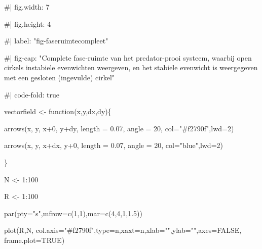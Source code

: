 \documentclass[
  a4paper,
]{scrbook}
\newenvironment{Shaded}{\begin{snugshade}}{\end{snugshade}}
\newcommand{\AttributeTok}[1]{\textcolor[rgb]{0.40,0.45,0.13}{#1}}
\newcommand{\CommentTok}[1]{\textcolor[rgb]{0.37,0.37,0.37}{#1}}
\newcommand{\ConstantTok}[1]{\textcolor[rgb]{0.56,0.35,0.01}{#1}}
\newcommand{\ControlFlowTok}[1]{\textcolor[rgb]{0.00,0.23,0.31}{#1}}
\newcommand{\DecValTok}[1]{\textcolor[rgb]{0.68,0.00,0.00}{#1}}
\newcommand{\FloatTok}[1]{\textcolor[rgb]{0.68,0.00,0.00}{#1}}
\newcommand{\FunctionTok}[1]{\textcolor[rgb]{0.28,0.35,0.67}{#1}}
\newcommand{\NormalTok}[1]{\textcolor[rgb]{0.00,0.23,0.31}{#1}}
\newcommand{\OtherTok}[1]{\textcolor[rgb]{0.00,0.23,0.31}{#1}}
\newcommand{\SpecialCharTok}[1]{\textcolor[rgb]{0.37,0.37,0.37}{#1}}
\newcommand{\StringTok}[1]{\textcolor[rgb]{0.13,0.47,0.30}{#1}}
\theoremstyle{definition}
\theoremstyle{remark}
\begin{document}
\begin{Shaded}
\begin{Highlighting}[]
\CommentTok{\#| fig.width: 7}

\CommentTok{\#| fig.height: 4}

\CommentTok{\#| label: "fig{-}faseruimtecompleet"}

\CommentTok{\#| fig{-}cap: "Complete fase{-}ruimte van het predator{-}prooi systeem, waarbij open cirkels instabiele evenwichten weergeven, en het stabiele evenwicht is weergegeven met een gesloten (ingevulde) cirkel"}

\CommentTok{\#| code{-}fold: true}

\NormalTok{vectorfield }\OtherTok{\textless{}{-}} \ControlFlowTok{function}\NormalTok{(x,y,dx,dy)\{}

  \FunctionTok{arrows}\NormalTok{(x, y, x}\SpecialCharTok{+}\DecValTok{0}\NormalTok{, y}\SpecialCharTok{+}\NormalTok{dy, }\AttributeTok{length =} \FloatTok{0.07}\NormalTok{, }\AttributeTok{angle =} \DecValTok{20}\NormalTok{, }\AttributeTok{col=}\StringTok{"\#f2790f"}\NormalTok{,}\AttributeTok{lwd=}\DecValTok{2}\NormalTok{)}

  \FunctionTok{arrows}\NormalTok{(x, y, x}\SpecialCharTok{+}\NormalTok{dx, y}\SpecialCharTok{+}\DecValTok{0}\NormalTok{, }\AttributeTok{length =} \FloatTok{0.07}\NormalTok{, }\AttributeTok{angle =} \DecValTok{20}\NormalTok{, }\AttributeTok{col=}\StringTok{"blue"}\NormalTok{,}\AttributeTok{lwd=}\DecValTok{2}\NormalTok{)}

\NormalTok{\}}

\NormalTok{N }\OtherTok{\textless{}{-}} \DecValTok{1}\SpecialCharTok{:}\DecValTok{100}

\NormalTok{R }\OtherTok{\textless{}{-}} \DecValTok{1}\SpecialCharTok{:}\DecValTok{100}

\FunctionTok{par}\NormalTok{(}\AttributeTok{pty=}\StringTok{"s"}\NormalTok{,}\AttributeTok{mfrow=}\FunctionTok{c}\NormalTok{(}\DecValTok{1}\NormalTok{,}\DecValTok{1}\NormalTok{),}\AttributeTok{mar=}\FunctionTok{c}\NormalTok{(}\DecValTok{4}\NormalTok{,}\DecValTok{4}\NormalTok{,}\DecValTok{1}\NormalTok{,}\FloatTok{1.5}\NormalTok{))}

\FunctionTok{plot}\NormalTok{(R,N,  }\AttributeTok{col.axis=}\StringTok{"\#f2790f"}\NormalTok{,}\AttributeTok{type=}\StringTok{\textquotesingle{}n\textquotesingle{}}\NormalTok{,}\AttributeTok{xaxt=}\StringTok{\textquotesingle{}n\textquotesingle{}}\NormalTok{,}\AttributeTok{xlab=}\StringTok{""}\NormalTok{,}\AttributeTok{ylab=}\StringTok{""}\NormalTok{,}\AttributeTok{axes=}\ConstantTok{FALSE}\NormalTok{, }\AttributeTok{frame.plot=}\ConstantTok{TRUE}\NormalTok{)}


\end{Highlighting}
\end{Shaded}
\end{document}
